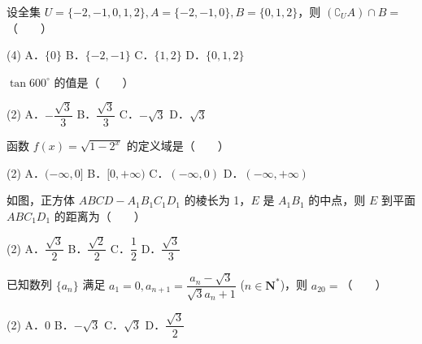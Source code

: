 

\begin{question}
设全集 $U = \{-2, -1, 0, 1, 2\}, A = \{-2, -1, 0\}, B = \{0, 1, 2\}$，则 $(\complement_U A) \cap B =$\mbox{（　　）}

\begin{gkopts}(4)
\task A．$\{0\}$
\task B．$\{-2, -1\}$
\task C．$\{1, 2\}$
\task D．$\{0, 1, 2\}$
\end{gkopts}

\end{question}
\begin{question}
$\tan 600^\circ$ 的值是\mbox{（　　）}

\begin{gkopts}(2)
\task A．$-\dfrac{\sqrt{3}}{3}$
\task B．$\dfrac{\sqrt{3}}{3}$
\task C．$-\sqrt{3}$
\task D．$\sqrt{3}$
\end{gkopts}

\end{question}
\begin{question}
函数 $f(x) = \sqrt{1 - 2^x}$ 的定义域是\mbox{（　　）}

\begin{gkopts}(2)
\task A．$(-\infty, 0]$
\task B．$[0, +\infty)$
\task C．$(-\infty, 0)$
\task D．$(-\infty, +\infty)$
\end{gkopts}

\Needspace{0.4\textheight}
\end{question}
\begin{question}
如图，正方体 $ABCD - A_1B_1C_1D_1$ 的棱长为 1，$E$ 是 $A_1B_1$ 的中点，则 $E$ 到平面 $ABC_1D_1$ 的距离为\mbox{（　　）}
\nopagebreak[4]
\begin{center}\end{center}
\nopagebreak[4]
\begin{gkopts}(2)
\task A．$\dfrac{\sqrt{3}}{2}$
\task B．$\dfrac{\sqrt{2}}{2}$
\task C．$\dfrac{1}{2}$
\task D．$\dfrac{\sqrt{3}}{3}$
\end{gkopts}

\end{question}
\begin{question}
已知数列 $\{a_n\}$ 满足 $a_1 = 0, a_{n+1} = \dfrac{a_n - \sqrt{3}}{\sqrt{3}a_n + 1}$ ($n \in \mathbf{N}^*$)，则 $a_{20} =$\mbox{（　　）}

\begin{gkopts}(2)
\task A．0
\task B．$-\sqrt{3}$
\task C．$\sqrt{3}$
\task D．$\dfrac{\sqrt{3}}{2}$
\end{gkopts}

\end{question}
